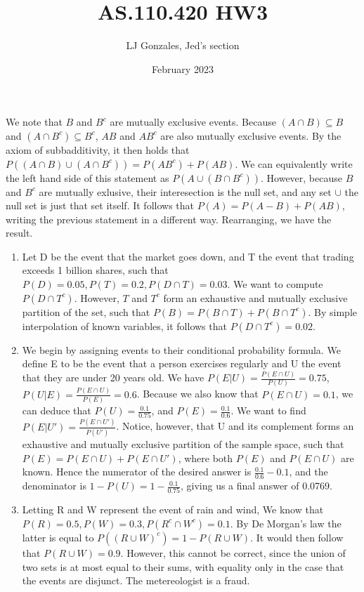 \documentclass{article}
\title{AS.110.420 HW3}
\author{LJ Gonzales, Jed's section}
\date{February 2023}
\begin{document}
\maketitle

\begin{prob}
	We note that $B$ and $B^c$ are mutually exclusive events. Because $(A \cap B) \subseteq B$ and  $(A \cap B^c) \subseteq B^c$, $AB$ and $AB^c$ are also mutually exclusive events.
	By the axiom of subbadditivity, it then holds that $P((A \cap B) \cup (A \cap B^c)) = P(AB^c)+P(AB)$. We can equivalently write the left hand side of this statement as $P(A \cup (B \cap B^c))$.
	However, because $B$ and $B^c$ are mutually exlusive, their interesection is the null set, and any set $\cup$ the null set is just that set itself.
	It follows that $P(A)=P(A-B)+P(AB)$, writing the previous statement in a different way. Rearranging, we have the result. 
\end{prob}

\begin{prob}
\begin{enumerate}
	\item Let D be the event that the market goes down, and T the event that trading exceeds 1 billion shares, such that $P(D)=0.05, P(T)=0.2, P(D \cap T)=0.03$.
		We want to compute $P(D \cap T^c)$. However, $T$ and $T^c$ form an exhaustive and mutually exclusive partition of the set, such that $P(B)=P(B \cap T)+P(B \cap T^c)$.
		By simple interpolation of known variables, it follows that $P(D \cap T^c)=0.02$.
	
	\item We begin by assigning events to their conditional probability formula. We define E to be the event that a person exercises regularly and U the event that they are under 20 years old.
	We have $P(E|U)=\frac{P(E \cap U)}{P(U)}=0.75$, $P(U|E)=\frac{P(E \cap U)}{P(E)}=0.6$. Because we also know that $P(E \cap U)=0.1$, we can deduce that $P(U)=\frac{0.1}{0.75}$, and $P(E)=\frac{0.1}{0.6}$.
	We want to find $P(E|U')=\frac{P(E \cap U')}{P(U')}$.
	Notice, however, that U and its complement forms an exhaustive and mutually exclusive partition of the sample space, such that $P(E)=P(E \cap U)+P(E \cap U')$, where both $P(E)$ and $P(E \cap U)$ are known.
	Hence the numerator of the desired answer is  $\frac{0.1}{0.6}-0.1$, and the denominator is $1-P(U)=1-\frac{0.1}{0.75}$, giving us a final answer of 0.0769.

	\item Letting R and W represent the event of rain and wind, We know that $P(R)=0.5, P(W)=0.3, P(R^c \cap W^c)=0.1$. 
		By De Morgan's law the latter is equal to $P((R \cup W)^c)=1-P(R \cup W)$. It would then follow that $P(R \cup W)=0.9$.
		However, this cannot be correct, since the union of two sets is at most equal to their sums, with equality only in the case that the events are disjunct. The metereologist is a fraud.
\end{enumerate}	
\end{prob}
\end{document}
